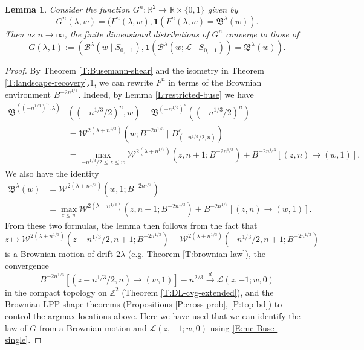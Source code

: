 \documentclass[11pt]{article}
\newcommand{\Z}{\mathbb{Z}}
\newcommand{\R}{\mathbb{R}}
\newcommand{\indic}{\mathbf{1}}
\newcommand{\la}{\lambda}
\newcommand{\cB}{\mathcal{B}}
\newcommand{\cL}{\mathcal{L}}
\newcommand{\cW}{\mathcal{W}}
\newcommand{\fB}{\mathfrak{B}}
\newcommand{\cvgd}{\stackrel{d}{\to}}
\newcommand{\X}{\times}
\newtheorem{lemma}[theorem]{Lemma}
\theoremstyle{definition} %
\theoremstyle{remark} %
\begin{document}
\begin{lemma}
	\label{L:Bla-distribution}
Consider the function $G^n:\R^2 \to \R \X \{0, 1\}$ given by
$$
G^n(\la, w) = (F^n(\la, w), \mathbf{1}(F^n(\la, w) = \fB^\la(w)).
$$
Then as $n \to \infty$, the finite dimensional distributions of $G^n$ converge to those of 
$$
G(\la, 1) := (\cB^\la(w \mid S^-_{0, -1}), \indic(\cB^\la(w; \cL \mid S^-_{0, -1})) = \fB^\la(w)).
$$
\end{lemma}

\begin{proof}
By Theorem \ref{T:Busemann-shear} and the isometry in Theorem \ref{T:landscape-recovery}.1, we can rewrite $F^n$ in terms of the Brownian environment $B^{-2n^{1/3}}$. Indeed, by Lemma \ref{L:restricted-buse} we have
\begin{align*}
\fB^{((-n^{1/3})^n, \la)}&((-n^{1/3}/2)^n,w) - \fB^{(-n^{1/3})^n}((-n^{1/3}/2)^n) \\
&= \cW^{2(\la + n^{1/3})}(w; B^{-2n^{1/3}} \mid D^c_{(-n^{1/3}/2, n)}) \\
&= \max_{-n^{1/3}/2 \le z \le w} \cW^{2(\la + n^{1/3})}(z, n + 1; B^{-2n^{1/3}}) + B^{-2n^{1/3}}[(z, n) \to (w, 1)].
\end{align*}
We also have the identity
\begin{align*}
\fB^{\la}(w) &= \cW^{2(\la + n^{1/3})}(w, 1; B^{-2n^{1/3}}) \\
&= \max_{z \le w} \cW^{2(\la + n^{1/3})}(z, n + 1; B^{-2n^{1/3}}) + B^{-2n^{1/3}}[(z, n) \to (w, 1)].
\end{align*}
From these two formulas, the lemma then follows from the fact that 
$$
z \mapsto \cW^{2(\la + n^{1/3})}(z - n^{1/3}/2, n + 1; B^{-2n^{1/3}}) - \cW^{2(\la + n^{1/3})}(- n^{1/3}/2, n + 1; B^{-2n^{1/3}})
$$
is a Brownian motion of drift $2\la$ (e.g. Theorem \ref{T:brownian-law}), the convergence 
$$
B^{-2n^{1/3}}[(z- n^{1/3}/2, n) \to (w, 1)] -  n^{2/3} \cvgd \cL(z, -1; w, 0)
$$
in the compact topology on $\Z^2$ (Theorem \ref{T:DL-cvg-extended}), and the Brownian LPP shape theorems (Propositions \ref{P:cross-prob}, \ref{P:top-bd}) to control the argmax locations above. Here we have used that we can identify the law of $G$ from a Brownian motion and $\cL(z, -1; w, 0)$ using \eqref{E:mc-Buse-single}.
\end{proof}
	
\end{document}
